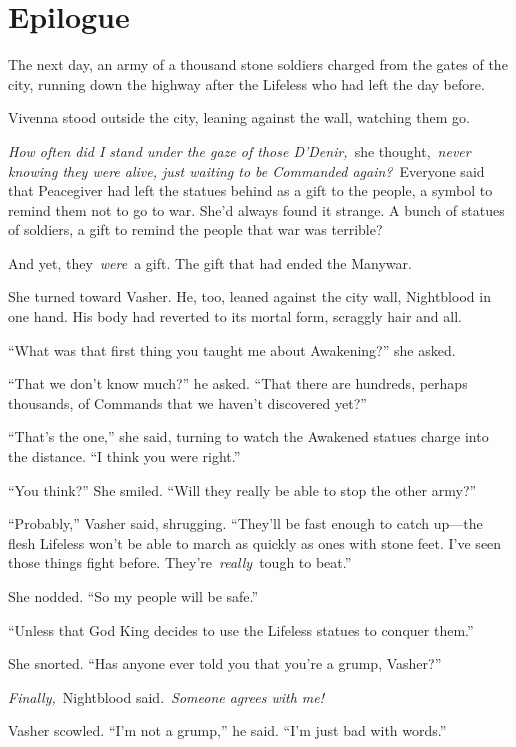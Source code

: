 \section{Epilogue}

The next day, an army of a thousand stone soldiers charged from the gates of the city, running down the highway after the Lifeless who had left the day before.

Vivenna stood outside the city, leaning against the wall, watching them go.

\textit{How often did I stand under the gaze of those D’Denir,}~she thought,~\textit{never knowing they were alive, just waiting to be Commanded again?}~Everyone said that Peacegiver had left the statues behind as a gift to the people, a symbol to remind them not to go to war. She’d always found it strange. A bunch of statues of soldiers, a gift to remind the people that war was terrible?

And yet, they~\textit{were}~a gift. The gift that had ended the Manywar.

She turned toward Vasher. He, too, leaned against the city wall, Nightblood in one hand. His body had reverted to its mortal form, scraggly hair and all.

“What was that first thing you taught me about Awakening?” she asked.

“That we don’t know much?” he asked. “That there are hundreds, perhaps thousands, of Commands that we haven’t discovered yet?”

“That’s the one,” she said, turning to watch the Awakened statues charge into the distance. “I think you were right.”

“You think?” She smiled. “Will they really be able to stop the other army?”

“Probably,” Vasher said, shrugging. “They’ll be fast enough to catch up—the flesh Lifeless won’t be able to march as quickly as ones with stone feet. I’ve seen those things fight before. They’re~\textit{really}~tough to beat.”

She nodded. “So my people will be safe.”

“Unless that God King decides to use the Lifeless statues to conquer them.”

She snorted. “Has anyone ever told you that you’re a grump, Vasher?”

\textit{Finally,}~Nightblood said.~\textit{Someone agrees with me!}

Vasher scowled. “I’m not a grump,” he said. “I’m just bad with words.”

